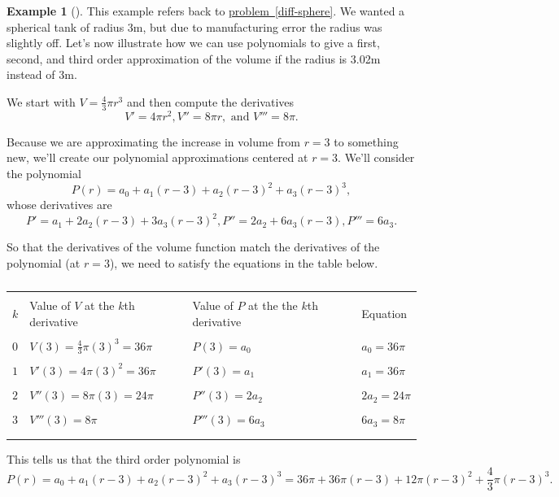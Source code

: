 \documentclass[10pt,]{book}
\theoremstyle{plain}
\theoremstyle{definition}
\theoremstyle{definition}
\theoremstyle{definition}
\newtheorem{example}[theorem]{Example}
\theoremstyle{definition}
\theoremstyle{definition}
\numberwithin{equation}{section}
\newcommand{\hrulethin}  {\noalign{\hrule height 0.04em}}
\begin{document}
\begin{example}[]\label{example-1}
This example refers back to \hyperref[diff-sphere]{problem~\ref{diff-sphere}}. We wanted a spherical tank of radius 3m, but due to manufacturing error the radius was slightly off. Let's now illustrate how we can use polynomials to give a first, second, and third order approximation of the volume if the radius is 3.02m instead of 3m.%
\par
We start with \(V=\frac{4}{3} \pi r^3\) and then compute the derivatives%
\begin{equation*}
V'=4\pi r^2, V''=8\pi r, \text{ and }  V'''=8\pi.
\end{equation*}
%
\par
Because we are approximating the increase in volume from \(r=3\) to something new, we'll create our polynomial approximations centered at \(r=3\). We'll consider the polynomial%
\begin{equation*}
P(r)=a_0+a_1(r-3)+a_2(r-3)^2+a_3(r-3)^3,
\end{equation*}
whose derivatives are%
\begin{equation*}
P'=a_1+2a_2(r-3)+3a_3(r-3)^2,
P''=2a_2+6a_3(r-3),
P'''=6a_3.
\end{equation*}
%
\par
So that the derivatives of the volume function match the derivatives of the polynomial (at \(r=3\)), we need to satisfy the equations in the table below.%
\begin{table}
\centering
\begin{tabular}{llll}
&&&\tabularnewline\hrulethin
\(k\)&Value of \(V\) at the \(k\)th derivative&Value of \(P\) at the the \(k\)th derivative&Equation\tabularnewline[0pt]
&&&\tabularnewline\hrulethin
\(0\)&\(V(3) = \frac{4}{3}\pi (3)^3 = 36\pi\)&\(P(3) = a_0\)&\(a_0=36\pi\)\tabularnewline[0pt]
&&&\tabularnewline\hrulethin
\(1\)&\(V'(3) = 4\pi (3)^2=36\pi\)&\(P'(3) = a_1\)&\(a_1=36\pi\)\tabularnewline[0pt]
&&&\tabularnewline\hrulethin
\(2\)&\(V''(3) = 8\pi (3)=24\pi\)&\(P''(3) = 2a_2\)&\(2a_2=24\pi\)\tabularnewline[0pt]
&&&\tabularnewline\hrulethin
\(3\)&\(V'''(3) = 8\pi\)&\(P'''(3) = 6a_3\)&\(6a_3=8\pi\)\tabularnewline[0pt]
&&&\tabularnewline\hrulethin
\end{tabular}
\caption{\label{table-1}}
\end{table}
This tells us that the third order polynomial is%
\begin{equation*}
P(r)=a_0+a_1(r-3)+a_2(r-3)^2+a_3(r-3)^3
=36\pi+36\pi(r-3)+12\pi(r-3)^2+\frac{4}{3}\pi(r-3)^3
.
\end{equation*}

\end{example}
\end{document}
